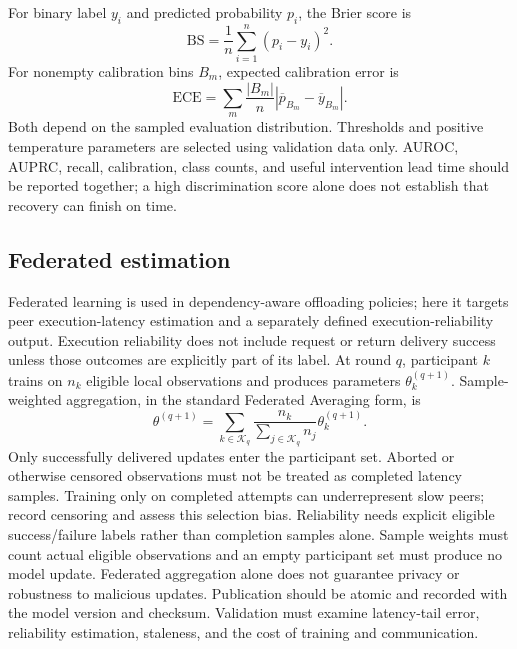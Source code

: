 \documentclass[11pt,a4paper]{article}
\begin{document}
For binary label $y_i$ and predicted probability $p_i$, the Brier score is
\begin{equation}
 \mathrm{BS}=\frac1n\sum_{i=1}^n(p_i-y_i)^2.
\end{equation}
For nonempty calibration bins $B_m$, expected calibration error is
\begin{equation}
 \mathrm{ECE}=\sum_m\frac{|B_m|}{n}
 \left|\overline p_{B_m}-\overline y_{B_m}\right|.
\end{equation}
Both depend on the sampled evaluation distribution. Thresholds and positive
temperature parameters are selected using validation data only. AUROC, AUPRC,
recall, calibration, class counts, and useful intervention lead time should be
reported together; a high discrimination score alone does not establish that
recovery can finish on time.

\subsection{Federated estimation}
Federated learning is used in dependency-aware offloading policies\cite{kaur2025};
here it targets peer execution-latency estimation and a separately defined
execution-reliability output. Execution reliability does not include request or
return delivery success unless those outcomes are explicitly part of its label.
At round $q$, participant $k$ trains on $n_k$ eligible local observations and
produces parameters $\theta_k^{(q+1)}$. Sample-weighted aggregation, in the standard Federated Averaging form, is
\begin{equation}
 \theta^{(q+1)}=\sum_{k\in\mathcal K_q}
 \frac{n_k}{\sum_{j\in\mathcal K_q}n_j}\theta_k^{(q+1)}.
\end{equation}
Only successfully delivered updates enter the participant set. Aborted or
otherwise censored observations must not be treated as completed latency
samples. Training only on completed attempts can underrepresent slow peers;
record censoring and assess this selection bias. Reliability needs explicit
eligible success/failure labels rather than completion samples alone. Sample
weights must count actual eligible observations and an empty participant set
must produce no model update. Federated aggregation alone does not guarantee
privacy or robustness to malicious updates. Publication should be atomic and recorded with the model version and
checksum. Validation must examine latency-tail error, reliability estimation,
staleness, and the cost of training and communication.
\end{document}
